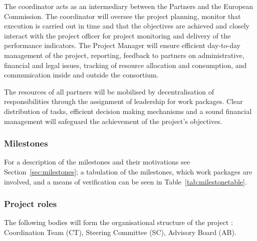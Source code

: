 The coordinator acts as an intermediary between the Partners and
the European Commission. The coordinator will oversee the project
planning, monitor that execution is carried out in time and that
the objectives are achieved and closely interact with the project
officer for project monitoring and delivery of the performance
indicators.  The Project Manager will ensure  efficient day-to-day
management of the project, reporting, feedback to partners on
administrative, financial and legal issues, tracking of  resource
allocation and consumption, and communication inside and outside the
consortium.

The resources of all partners will be mobilised by decentralisation of
responsibilities through the assignment of leadership for work
packages. Clear distribution of tasks, efficient decision making
mechanisms and a sound financial management will safeguard the
achievement of the project's objectives.

\ifgrantagreement\else
\subsubsection{Milestones}
For a description of the milestones and their motivations see
Section~\ref{sec:milestones}; a tabulation of the milestones, which work packages
are involved, and a means of verification can be seen in Table~\ref{tab:milestonetable}.

\fi

\subsubsection{Project roles}


The following bodies will form the organisational structure of the
\TheProject project : Coordination Team (CT), Steering Committee (SC),
Advisory Board (AB).%

